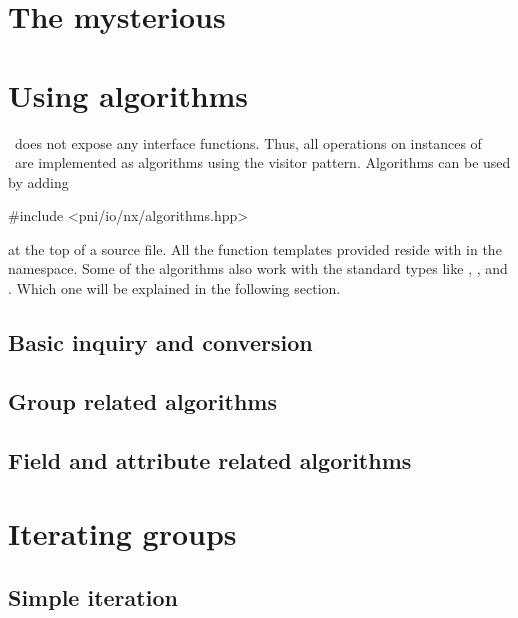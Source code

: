 \section{The mysterious \nxobject}\label{section:nxobject}



\section{Using algorithms}\label{section:algorithms}

\nxobject\ does not expose any interface functions. Thus, all operations on 
instances of \nxobject\ are implemented as algorithms using the visitor pattern. 
Algorithms can be used by adding 
\begin{cppcode}
#include <pni/io/nx/algorithms.hpp>
\end{cppcode}
at the top of a source file. All the function templates provided 
reside with in the  namespace. 
Some of the algorithms also work with the standard types like \nxfield,
\nxgroup, and \nxattribute. Which one will be explained in the following
section.

\subsection{Basic inquiry and conversion}



\subsection{Group related algorithms}


\subsection{Field and attribute related algorithms}


\section{Iterating groups}\label{section:group_iteration}

\subsection{Simple iteration}

